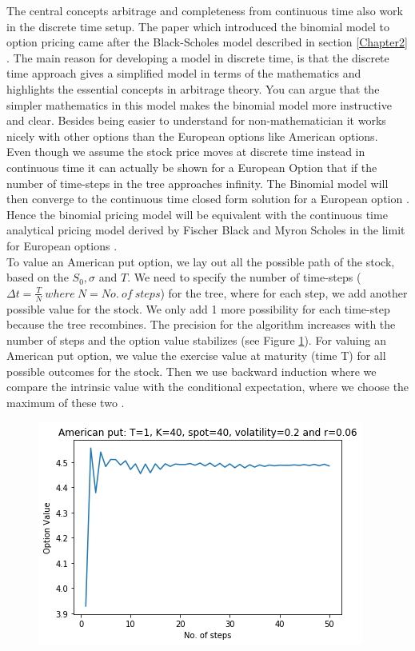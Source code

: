 The central concepts arbitrage and completeness from continuous time also work in the discrete time setup. The paper \parencite{CRR} which introduced the binomial model to option pricing came after the Black-Scholes model described in section \ref{Chapter2} \parencite{B-S-Paper}. The main reason for developing a model in discrete time, is that the discrete time approach gives a simplified model in terms of the mathematics and highlights the essential concepts in arbitrage theory. You can argue that the simpler mathematics in this model makes the binomial model more instructive and clear. Besides being easier to understand for non-mathematician it works nicely with other options than the European options like American options.\\

Even though we assume the stock price moves at discrete time instead in continuous time it can actually be shown for a European Option that if the number of time-steps in the tree approaches infinity. The Binomial model will then converge to the continuous time closed form solution for a European option \parencite{CRR} \parencite{Hull}. Hence the binomial pricing model will be equivalent with the continuous time analytical pricing model derived by Fischer Black and Myron Scholes in the limit for European options \parencite{CRR}.\\

To value an American put option, we lay out all the possible path of the stock, based on the $S_0,\sigma$ and $T$. We need to specify the number of time-steps ($\Delta t = \frac{T}{N} \ where \ N=No. \ of  \ steps$) for the tree, where for each step, we add another possible value for the stock. We only add 1 more possibility for each time-step because the tree recombines. The precision for the algorithm increases with the number of steps and the option value stabilizes (see Figure \ref{fig:binConv}). For valuing an American put option, we value the exercise value at maturity (time T) for all possible outcomes for the stock. Then we use backward induction where we compare the intrinsic value with the conditional expectation, where we choose the maximum of these two \parencite{Hull}. 
 
\begin{figure}[th]
\centering
\includegraphics{Figures/binConv.png}
\decoRule
\caption[Convergence Of Binomial Model]{}
\label{fig:binConv}
\end{figure}


